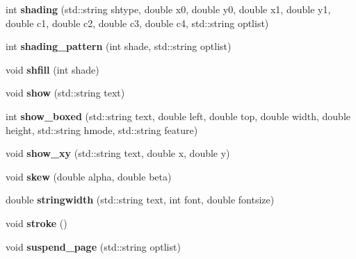 \begin{DoxyCompactItemize}
\item 
\hypertarget{classPDFlib_afdd28cd764f222f1c102323a42657643}{int {\bfseries shading} (std\-::string shtype, double x0, double y0, double x1, double y1, double c1, double c2, double c3, double c4, std\-::string optlist)}\label{classPDFlib_afdd28cd764f222f1c102323a42657643}

\item 
\hypertarget{classPDFlib_af7936c5fdacd6363b41811f02e6bead9}{int {\bfseries shading\-\_\-pattern} (int shade, std\-::string optlist)}\label{classPDFlib_af7936c5fdacd6363b41811f02e6bead9}

\item 
\hypertarget{classPDFlib_acc1378fc57dce8d3fbdd218aaa95f8dc}{void {\bfseries shfill} (int shade)}\label{classPDFlib_acc1378fc57dce8d3fbdd218aaa95f8dc}

\item 
\hypertarget{classPDFlib_aaa7923ae29e03873a5ef1e80156b75c6}{void {\bfseries show} (std\-::string text)}\label{classPDFlib_aaa7923ae29e03873a5ef1e80156b75c6}

\item 
\hypertarget{classPDFlib_af282c4e9f187a86ac103ec9438722040}{int {\bfseries show\-\_\-boxed} (std\-::string text, double left, double top, double width, double height, std\-::string hmode, std\-::string feature)}\label{classPDFlib_af282c4e9f187a86ac103ec9438722040}

\item 
\hypertarget{classPDFlib_a28f2a9cae7188472df3a0d75e7bac6ac}{void {\bfseries show\-\_\-xy} (std\-::string text, double x, double y)}\label{classPDFlib_a28f2a9cae7188472df3a0d75e7bac6ac}

\item 
\hypertarget{classPDFlib_a66323e008c1980539c58a2647af31b1a}{void {\bfseries skew} (double alpha, double beta)}\label{classPDFlib_a66323e008c1980539c58a2647af31b1a}

\item 
\hypertarget{classPDFlib_afd8b4b2ff6fa254cc386047bddfbede1}{double {\bfseries stringwidth} (std\-::string text, int font, double fontsize)}\label{classPDFlib_afd8b4b2ff6fa254cc386047bddfbede1}

\item 
\hypertarget{classPDFlib_ab212bd6e1bc82f8f00f807438218bc5d}{void {\bfseries stroke} ()}\label{classPDFlib_ab212bd6e1bc82f8f00f807438218bc5d}

\item 
\hypertarget{classPDFlib_ac047054d3779c38b144b3f5dbd6b81b8}{void {\bfseries suspend\-\_\-page} (std\-::string optlist)}\label{classPDFlib_ac047054d3779c38b144b3f5dbd6b81b8}


\end{DoxyCompactItemize}
